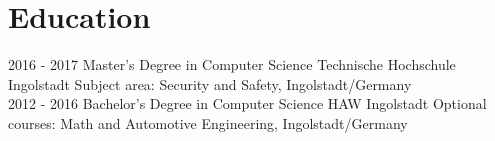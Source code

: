 \documentclass[]{friggeri-cv}
\begin{document}
\begin{entrylist}
\end{entrylist}

\section{Education}
\begin{entrylist}
  \entry
    {2016 - 2017}
    {Master's Degree in Computer Science}
    {Technische Hochschule Ingolstadt}
    {Subject area: Security and Safety, Ingolstadt/Germany\\}
  \entry
    {2012 - 2016}
    {Bachelor's Degree in Computer Science}
    {HAW Ingolstadt}
    {Optional courses: Math and Automotive Engineering, Ingolstadt/Germany}
\end{entrylist}

\newpage
\end{document}
